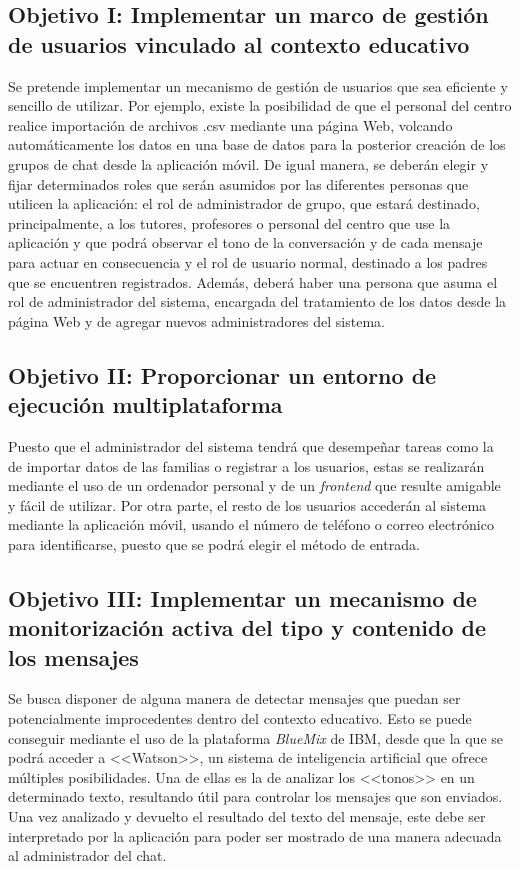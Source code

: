 \subsection{Objetivo I: Implementar un marco de gestión de usuarios vinculado al contexto educativo}
Se pretende implementar un mecanismo de gestión de usuarios que sea eficiente y sencillo de utilizar. Por ejemplo, existe la posibilidad de que el personal del centro realice importación de archivos .csv mediante una página Web, volcando automáticamente los datos en una base de datos para la posterior creación de los grupos de chat desde la aplicación móvil. De igual manera, se deberán elegir y fijar determinados roles que serán asumidos por las diferentes personas que utilicen la aplicación: el rol de administrador de grupo, que estará destinado, principalmente, a los tutores, profesores o personal del centro que use la aplicación y que podrá observar el tono de la conversación y de cada mensaje para actuar en consecuencia y el rol de usuario normal, destinado a los padres que se encuentren registrados. Además, deberá haber una persona que asuma el rol de administrador del sistema, encargada del tratamiento de los datos desde la página Web y de agregar nuevos administradores del sistema.

\subsection{Objetivo II: Proporcionar un entorno de ejecución multiplataforma}
Puesto que el administrador del sistema tendrá que desempeñar tareas como la de importar datos de las familias o registrar a los usuarios, estas se realizarán mediante el uso de un ordenador personal y de un \textit{frontend} que resulte amigable y fácil de utilizar. Por otra parte, el resto de los usuarios accederán al sistema mediante la aplicación móvil, usando el número de teléfono o correo electrónico para identificarse, puesto que se podrá elegir el método de entrada.

\subsection{Objetivo III: Implementar un mecanismo de monitorización activa del tipo y contenido de los mensajes}
Se busca disponer de alguna manera de detectar mensajes que puedan ser potencialmente improcedentes dentro del contexto educativo. Esto se puede conseguir mediante el uso de la plataforma \textit{BlueMix} de IBM, desde que la que se podrá acceder a <<Watson>>, un sistema de inteligencia artificial que ofrece múltiples posibilidades. Una de ellas es la de analizar los <<tonos>> en un determinado texto, resultando útil para controlar los mensajes que son enviados. Una vez analizado y devuelto el resultado del texto del mensaje, este debe ser interpretado por la aplicación para poder ser mostrado de una manera adecuada al administrador del chat.

